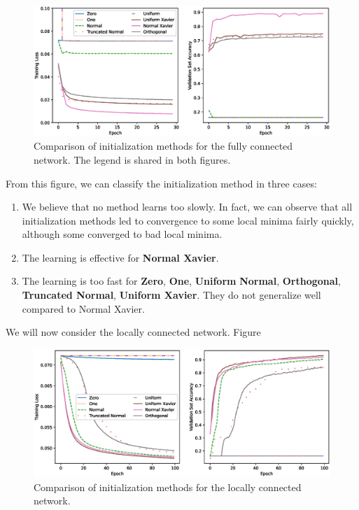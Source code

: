 \documentclass[
	12pt, %
]{../Template/fphw}
\begin{document}
\begin{enumerate}[label = (\arabic*)]
    \begin{figure}[!htbp]
        \centering
        \includegraphics[width=\textwidth]{initialization_comparison}
        \caption{Comparison of initialization methods for the fully connected network. The legend is shared in both figures.}
        \label{fig:init_fc}
    \end{figure}
    From this figure, we can classify the initialization method in three cases:
    \begin{enumerate}[label=(\roman*)]
        \item We believe that no method learns too slowly. In fact, we can observe that all initialization methods led to convergence to some local minima fairly quickly, although some converged to bad local minima.
        \item The learning is effective for \textbf{Normal Xavier}.
        \item The learning is too fast for  \textbf{Zero}, \textbf{One}, \textbf{Uniform} \textbf{Normal}, \textbf{Orthogonal}, \textbf{Truncated Normal}, \textbf{Uniform Xavier}. They do not generalize well compared to Normal Xavier.
    \end{enumerate}
    We will now consider the locally connected network. Figure 

    \begin{figure}[!htbp]
        \centering
        \includegraphics[width=\textwidth]{initialization_comparison_lc}
        \caption{Comparison of initialization methods for the locally connected network.}
        \label{fig:init_lc}
    \end{figure}


\end{enumerate}
\end{document}
